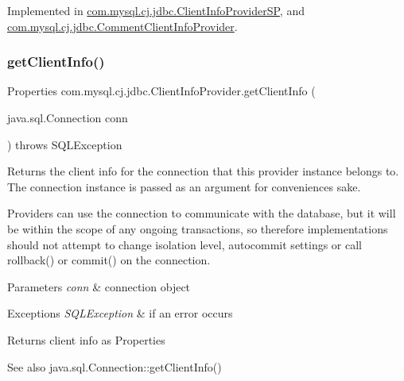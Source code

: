 Implemented in \mbox{\hyperlink{classcom_1_1mysql_1_1cj_1_1jdbc_1_1_client_info_provider_s_p_af68fc4a5dc0ca1325f17b78a19a5a3ff}{com.\+mysql.\+cj.\+jdbc.\+Client\+Info\+Provider\+SP}}, and \mbox{\hyperlink{classcom_1_1mysql_1_1cj_1_1jdbc_1_1_comment_client_info_provider_adc5904bfd14f15ad4976e4df42d004b7}{com.\+mysql.\+cj.\+jdbc.\+Comment\+Client\+Info\+Provider}}.

\mbox{\label{interfacecom_1_1mysql_1_1cj_1_1jdbc_1_1_client_info_provider_ac0bf93f0436618158753cb1f7ce7b463}} 
\subsubsection{\texorpdfstring{get\+Client\+Info()}{getClientInfo()}\hspace{0.1cm}{\footnotesize\ttfamily [1/2]}}
{\footnotesize\ttfamily Properties com.\+mysql.\+cj.\+jdbc.\+Client\+Info\+Provider.\+get\+Client\+Info (\begin{DoxyParamCaption}\item[{java.\+sql.\+Connection}]{conn }\end{DoxyParamCaption}) throws S\+Q\+L\+Exception}

Returns the client info for the connection that this provider instance belongs to. The connection instance is passed as an argument for convenience\textquotesingle{}s sake.

Providers can use the connection to communicate with the database, but it will be within the scope of any ongoing transactions, so therefore implementations should not attempt to change isolation level, autocommit settings or call rollback() or commit() on the connection.


\begin{DoxyParams}{Parameters}
{\em conn} & connection object \\
\hline
\end{DoxyParams}

\begin{DoxyExceptions}{Exceptions}
{\em S\+Q\+L\+Exception} & if an error occurs \\
\hline
\end{DoxyExceptions}
\begin{DoxyReturn}{Returns}
client info as Properties 
\end{DoxyReturn}
\begin{DoxySeeAlso}{See also}
java.\+sql.\+Connection\+::get\+Client\+Info() 
\end{DoxySeeAlso}


